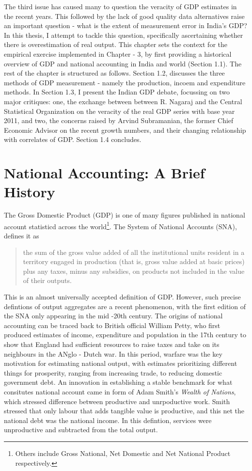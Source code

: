 \documentclass[12pt,nobind, a4paper]{reedthesis}
\begin{document}
 The third issue has caused many to question the veracity of GDP estimates in the recent years. This followed by the lack of good quality data alternatives raise an important question - what is the extent of measurement error in India's GDP? In this thesis, I attempt to tackle this question, specifically ascertaining whether there is overestimation of real output. This chapter sets the context for the empirical exercise implemented in Chapter - 3, by first providing a historical overview of GDP and national accounting in India and world (Section 1.1). The rest of the chapter is structured as follows. Section 1.2, discusses the three methods of GDP measurement - namely the production, incoem and expenditure methods. In Section 1.3, I present the Indian GDP debate, focussing on two major critiques: one, the exchange between between R. Nagaraj and the Central Statistical Organization on the veracity of the real GDP series with base year 2011, and two, the concerns raised by Arvind Subramanian, the former Chief Economic Advisor on the recent growth numbers, and their changing relationship with correlates of GDP. Section 1.4 concludes.

 \hypertarget{national-accounting-a-brief-history}{%
 \section{National Accounting: A Brief History}\label{national-accounting-a-brief-history}}

 The Gross Domestic Product (GDP) is one of many figures published in national account statisticd across the world\footnote{Others include Gross National, Net Domestic and Net National Product respectively.}. The System of National Accounts (SNA), defines it as
 \begin{quote}
 the sum of the gross value added of all the institutional units resident in a territory engaged in production (that is, gross value added at basic prices) plus any taxes, minus any subsidies, on products not included in the value of their 
 outputs.
 \end{quote}
 This is an almost universally accepted definition of GDP. However, such precise defintions of output aggregates are a recent phenomenon, with the first edition of the SNA only appearing in the mid -20th century. The origins of national accounting can be traced back to British official William Petty, who first produced estimates of income, expenditure and population in the 17th century to show that England had sufficient resources to raise taxes and take on its neighbours in the ANglo - Dutch war. In this period, warfare was the key motivation for estimating national output, with estimates prioritizing different things for prosperity, ranging from increasing trade, to reducing domestic government debt. An innovation in establishing a stable benchmark for what consitutes national account came in form of Adam Smith's \emph{Wealth of Nations}, which stressed difference between productive and unrpoductive work. Smith stressed that only labour that adds tangible value is productive, and this net the national debt was the national income. In this defintion, services were unproductive and subtracted from the total output.
 \linebreak
\end{document}
